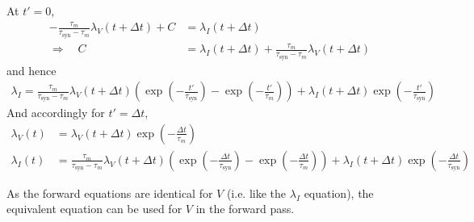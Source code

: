 \documentclass[a4paper]{article}
\begin{document}
At $t' = 0$,
\begin{align}
  - \frac{\tau_m}{\tau_{\text{syn}}-\tau_m} \lambda_V(t+\Delta t) + C
  &= \lambda_I(t+\Delta t) \\
  \Rightarrow \quad  C &= \lambda_I(t+\Delta t)  +
  \frac{\tau_m}{\tau_{\text{syn}}-\tau_m} \lambda_V(t+\Delta t)
\end{align}
and hence
\begin{align}
  \lambda_I = \frac{\tau_m}{\tau_{\text{syn}}-\tau_m}
  \lambda_V(t+\Delta t)  \left(\exp\left(-\frac{t'}{\tau_{\text{syn}}}\right) - \exp\left(-\frac{t'}{\tau_m}\right)\right) + \lambda_I(t+\Delta t) \exp\left(-\frac{t'}{\tau_{\text{syn}}}\right)
\end{align}
And accordingly for $t' = \Delta t$,
\begin{align}
  \lambda_V (t) &= \lambda_V(t+\Delta t) \exp\left(-\frac{\Delta
    t}{\tau_m}\right) \\
  \lambda_I (t) &= \frac{\tau_m}{\tau_{\text{syn}}-\tau_m}
  \lambda_V(t+\Delta t)  \left(\exp\left(-\frac{\Delta
    t}{\tau_{\text{syn}}}\right) - \exp\left(-\frac{\Delta
    t}{\tau_m}\right)\right) + \lambda_I(t+\Delta t)
  \exp\left(-\frac{\Delta t}{\tau_{\text{syn}}}\right)
\end{align}

 As the forward equations are identical for $V$ (i.e. like the $\lambda_I$ equation), the equivalent equation can be used for $V$ in the forward pass.
\end{document}
